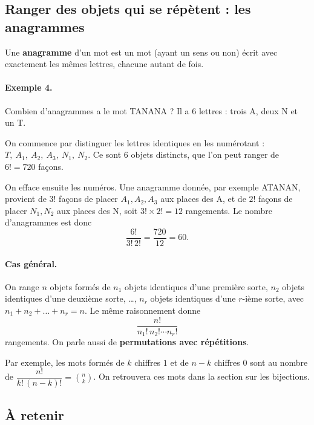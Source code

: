 \subsection{Ranger des objets qui se répètent : les anagrammes}

Une \textbf{anagramme} d’un mot est un mot (ayant un sens ou non) écrit avec exactement les
mêmes lettres, chacune autant de fois.

\paragraph{Exemple 4.}
Combien d’anagrammes a le mot TANANA ? Il a \(6\) lettres : trois A, deux N et un T.

On commence par distinguer les lettres identiques en les numérotant :
\(T,\ A_1,\ A_2,\ A_3,\ N_1,\ N_2\). Ce sont \(6\) objets distincts, que l’on peut ranger de
\(6!=720\) façons.

On efface ensuite les numéros. Une anagramme donnée, par exemple ATANAN, provient de
\(3!\) façons de placer \(A_1,A_2,A_3\) aux places des A, et de \(2!\) façons de placer
\(N_1,N_2\) aux places des N, soit \(3!\times 2!=12\) rangements. Le nombre d’anagrammes est donc
\[
\frac{6!}{3!\,2!}=\frac{720}{12}=60.
\]

\paragraph{Cas général.}
On range \(n\) objets formés de \(n_1\) objets identiques d’une première sorte, \(n_2\) objets
identiques d’une deuxième sorte, \dots, \(n_r\) objets identiques d’une \(r\)-ième sorte, avec
\(n_1+n_2+\dots+n_r=n\). Le même raisonnement donne
\[
\boxed{\frac{n!}{n_1!\,n_2!\cdots n_r!}}
\]
rangements. On parle aussi de \textbf{permutations avec répétitions}.

Par exemple, les mots formés de \(k\) chiffres \(1\) et de \(n-k\) chiffres \(0\) sont au nombre
de \(\dfrac{n!}{k!\,(n-k)!}=\binom{n}{k}\). On retrouvera ces mots dans la section sur les bijections.

\subsection{À retenir}

